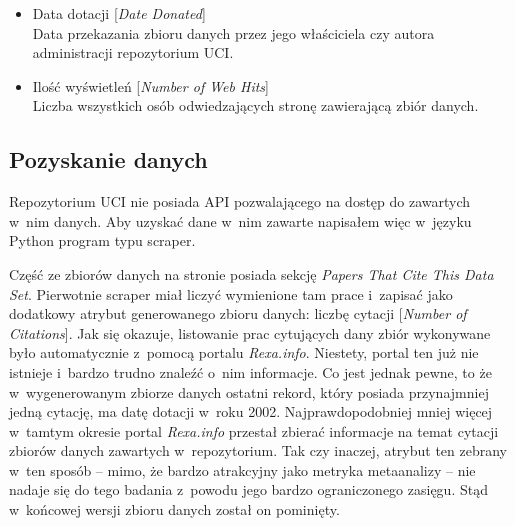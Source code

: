 \begin{itemize}
  \item Data dotacji [\emph{Date Donated}] \\
        Data przekazania zbioru danych przez jego właściciela czy autora administracji repozytorium UCI.

  \item Ilość wyświetleń [\emph{Number of Web Hits}] \\
        Liczba wszystkich osób odwiedzających stronę zawierającą zbiór danych.

\end{itemize}

\subsection{Pozyskanie danych}

Repozytorium UCI nie posiada API pozwalającego na dostęp do zawartych w~nim danych.
Aby uzyskać dane w~nim zawarte napisałem więc w~języku Python program typu scraper.

Część ze zbiorów danych na stronie posiada sekcję \emph{Papers That Cite This Data Set}.
Pierwotnie scraper miał liczyć wymienione tam prace i~zapisać jako dodatkowy atrybut generowanego zbioru danych: liczbę cytacji [\emph{Number of Citations}].
Jak się okazuje, listowanie prac cytujących dany zbiór wykonywane było automatycznie z~pomocą portalu \emph{Rexa.info}.
Niestety, portal ten już nie istnieje i~bardzo trudno znaleźć o~nim informacje.
Co jest jednak pewne, to że w~wygenerowanym zbiorze danych ostatni rekord, który posiada przynajmniej jedną cytację, ma datę dotacji w~roku 2002.
Najprawdopodobniej mniej więcej w~tamtym okresie portal \emph{Rexa.info} przestał zbierać informacje na temat cytacji zbiorów danych zawartych w~repozytorium.
Tak czy inaczej, atrybut ten zebrany w~ten sposób -- mimo, że bardzo atrakcyjny jako metryka metaanalizy -- nie nadaje się do tego badania z~powodu jego bardzo ograniczonego zasięgu.
Stąd w~końcowej wersji zbioru danych został on pominięty.

